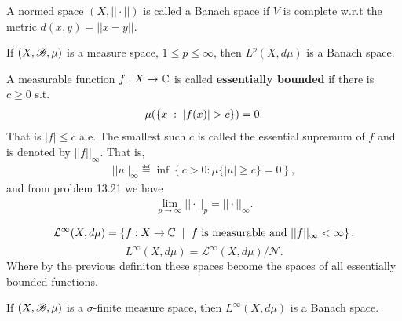 \begin{definition}
    A normed space $(X,||\cdot||)$ is called a Banach space if $V$ is complete w.r.t the metric $d(x,y)=||x-y||$.
\end{definition}

\begin{theorem}
    If $(X,\mathscr{B},\mu)$ is a measure space, $1\leq p\leq \infty$, then $L^p(X,d\mu)$ is a Banach space.
\end{theorem}

\begin{definition}
    A measurable function $f:X\rightarrow \mathbb{C}$ is called \textbf{essentially bounded} if there is $c\geq 0$ s.t. 
    \begin{align}
    \mu(\left\{ x\omm:\omm |f(x)|>c \right\})=0.    
    \end{align}
    That is $|f|\leq c$ a.e. The smallest such $c$ is called the essential supremum of $f$ and is denoted by $||f||_\infty.$ That is,
    \begin{align*}
        ||u||_{\infty} \eqdef \inf\left\{c>0:\mu\{|u|\geq c\}=0\right\},
    \end{align*}
    and from problem 13.21 we have
    \begin{align*}
        \lim\limits_{p\rightarrow\infty} ||\cdot ||_p = ||\cdot||_{\infty}.
    \end{align*}
\end{definition}

\begin{definition}
    $$\mathcal L^\infty(X,d\mu) = \left\{ f:X\rightarrow \mathbb{C}\hspace{2mm}|\hspace{2mm} f\text{ is measurable and }||f||_\infty <\infty \right\}.$$
    $$L^\infty (X,d\mu) =\mathcal L^\infty(X,d\mu)/\mathcal N. $$
    Where by the previous definiton these spaces become the spaces of all essentially bounded functions. 
\end{definition}
\begin{theorem}
    If $(X,\mathscr{B},\mu)$ is a $\sigma$-finite measure space, then $L^\infty(X,d\mu)$ is a Banach space.
\end{theorem}
